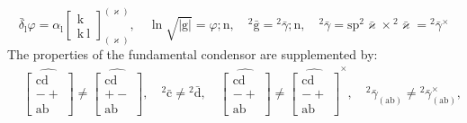 \documentclass[12pt]{article}
\begin{document}
\begin{itemize}
\begin{equation}
\end{equation}
    \begin{equation}
    \bar{\delta}_\mathrm{l} \varphi = \alpha_\mathrm{l} \left[ \begin{matrix} \mathrm{k} \\ \mathrm{k\ l} \end{matrix} \right]^{(\varkappa)}_{(\varkappa)}, \quad \ln\sqrt{|\mathrm{g}|} = \varphi;\mathrm{n}, \quad {}^2\bar{\mathrm{g}} = {}^2\bar{\gamma};\mathrm{n}, \quad {}^2\bar{\gamma} = \mathrm{sp}{}^2\bar{\varkappa} \times {}^2\bar{\varkappa} = {}^2\bar{\gamma}^\times \tag{93c}
    \end{equation}
    The properties of the fundamental condensor are supplemented by:
    \begin{equation}
    \begin{aligned}
    & \widehat{\left[ \begin{matrix} \mathrm{cd} \\ - + \\ \mathrm{ab} \end{matrix} \right]} \neq \widehat{\left[ \begin{matrix} \mathrm{cd} \\ + - \\ \mathrm{ab} \end{matrix} \right]}, \quad {}^2\bar{\mathrm{c}} \neq {}^2\bar{\mathrm{d}}, \quad \widehat{\left[ \begin{matrix} \mathrm{cd} \\ - + \\ \mathrm{ab} \end{matrix} \right]} \neq \widehat{\left[ \begin{matrix} \mathrm{cd} \\ - + \\ \mathrm{ab} \end{matrix} \right]}^\times, \quad {}^2\bar{\gamma}_{(\mathrm{ab})} \neq {}^2\bar{\gamma}_{(\mathrm{ab})}^\times, \\

\end{aligned}
\end{equation}
\end{itemize}
\end{document}

